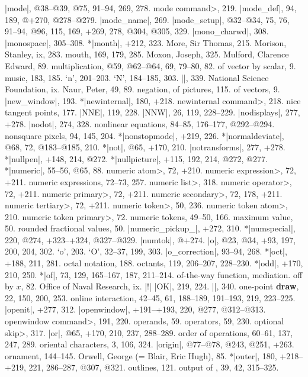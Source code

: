 |mode|, @38--@39, @75, 91--94, 269, 278.
\<mode command>, 219.
|mode_def|, 94, 189, @+270, @278--@279.
|mode_name|, 269.
|mode_setup|, @32--@34, 75, 76, 91--94, @96, 115, 169, +269, 278, @304, @305,
 329.
|mono_charwd|, 308.
|monospace|, 305--308.
*|month|, +212, 323.
More, Sir Thomas, 215.
Morison, Stanley, ix, 283.
mouth, 169, 179, 285.
Moxon, Joseph, 325.
Mulford, Clarence Edward, 89.
multiplication, @59, @62--@64, 69, 79--80, 82.
\sub of vector by scalar, 9.
music, 183, 185.
\newletter
`n', 201--203.
`N', 184--185, 303.
|\names|, 339.
National Science Foundation, ix.
Naur, Peter, 49, 89.
negation, of pictures, 115.
\sub of vectors, 9.
|new_window|, 193.
*|newinternal|, 180, +218.
\<newinternal command>, 218.
nice tangent points, 177.
|NNE|, 119, 228.
|NNW|, 26, 119, 228--229.
|nodisplays|, 277, +278.
|nodot|, 274, 328.
nonlinear equations, 84--85, 176--177, @292--@294.
nonsquare pixels, 94, 145, 204.
*|nonstopmode|, +219, 226.
*|normaldeviate|, @68, 72, @183--@185, 210.
*|not|, @65, +170, 210.
|notransforms|, 277, +278.
*|nullpen|, +148, 214, @272.
*|nullpicture|, +115, 192, 214, @272, @277.
*|numeric|, 55--56, @65, 88.
\<numeric atom>, 72, +210.
\<numeric expression>, 72, +211.
numeric expressions, 72--73, 257.
\<numeric list>, 318.
\<numeric operator>, 72, +211.
\<numeric primary>, 72, +211.
\<numeric secondary>, 72, 178, +211.
\<numeric tertiary>, 72, +211.
\<numeric token>, 50, 236.
\<numeric token atom>, 210.
\<numeric token primary>, 72.
numeric tokens, 49--50, 166.
\sub maximum value, 50.
\sub rounded fractional values, 50.
|numeric_pickup_|, +272, 310.
*|numspecial|, 220, @274, +323--+324, @327--@329.
|numtok|, @+274.
\newletter
|o|, @23, @34, +93, 197, 200, 204, 302.
`o', 203.
`O', 32--37, 199, 303.
|o_correction|, 93--94, 268.
*|oct|, +188, 211, 281.
octal notation, 188.
octants, 119, 206--207, 228--230.
*|odd|, +170, 210, 250.
*|of|, 73, 129, 165--167, 187, 211--214.
of-the-way function, \see mediation.
off by $x$, 82.
Office of Naval Research, ix.
|!| |OK|, 219, 224.
|\omitaccents|, 340.
one-point {\bf draw}, 22, 150, 200, 253.
online interaction, 42--45, 61, 188--189, 191--193, 219, 223--225.
|openit|, +277, 312.
|openwindow|, +191--+193, 220, @277, @312--@313.
\<openwindow command>, 191, 220.
operands, 59.
operators, 59, 230.
\<optional skip>, 317.
|or|, @65, +170, 210, 237, 288--289.
order of operations, 60--61, 137, 247, 289.
oriental characters, 3, 106, 324.
|origin|, @77--@78, @243, @251, +263.
ornament, 144--145.
Orwell, George (= Blair, Eric Hugh), 85.
*|outer|, 180, +218--+219, 221, 286--287, @307, @321.
outlines, 121.
output of \MF, 39, 42, 315--325.
